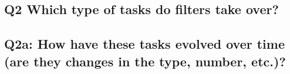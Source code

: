 \begin{comment}
maybe it's a historical phenomenon (in many regards):
* perhaps there were differences that are not essential anymore, such as:
  * on which infrastructure does it run (part of the core software vs own computers of the bot operators)
  * filters are triggered *before* an edit is even published, whereas bots (and tools) can revert an edit post factum. Is this really an important difference in times when bots need a couple of seconds to revert an edit?
* perhaps the extension was implemented because someone was capable of implementing and working well with this type of systems so they just went and did it (do-ocracy; Wikipedia as a collaborative volunteer project);
* perhaps it still exists in times of fancier machine learning based tools (or bots) because rule-based systems are more transparent/easily understandable for humans and writing a regex is simpler than coding a bot.
* hypothesis: it is easier to set up a filter than program a bot. Setting up a filter requires "only" understanding of regular expressions. Programming a bot requires knowledge of a programming language and understanding of the API.
\end{comment}

\begin{comment}
Interestingly, there was a guideline somewhere stating that no trivial formatting mistakes should trip filters\cite{Wikipedia:EditFilterRequested}
I actually think, a bot fixing this would be more appropriate.
## Open questions

If discerning motivation is difficult, and, we want to achieve different results, depending on the motivation, that lead us to the question whether filtering is the proper mechanism to deal with disruptive edits.

\end{comment}

\subsection{Q2 Which type of tasks do filters take over?}

\subsection{Q2a: How have these tasks evolved over time (are they changes in the type, number, etc.)?}




